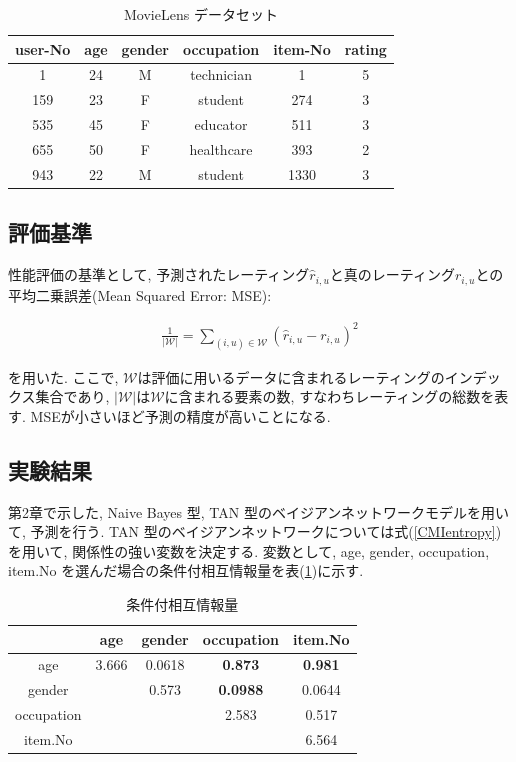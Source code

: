 \documentclass[a4j,12pt]{jarticle}
\begin{document}
\begin{table}[H]
\begin{center}
\caption{MovieLens データセット}   %
\begin{tabular}{|c|c|c|c|c|c|}
\hline
user-No	&	age	&	gender	&	occupation	&	item-No	& rating \\ \hline \hline
1	&	24	&	M	&	technician	&  1  & 5 \\	\hline
159	&    23	&     F	&      student	      &  274 & 3 \\	\hline
535	&	45	&	F	&	educator	&	511	& 3 \\ \hline
655	&	50	&	F	&	healthcare	& 393 & 2 \\	\hline
943	&	22	&	M	&	student	&	1330 & 3 \\  \hline
\end{tabular}
\end{center}
\end{table}
\subsection{評価基準}

性能評価の基準として, 予測されたレーティング$\hat{r}_{i, u}$と真のレーティング$r_{i, u}$との平均二乗誤差(Mean Squared Error: MSE):

\begin{eqnarray}
\label{MSE}
\frac{1}{|\mathcal W|} = \sum_{(i, u) \in \mathcal W} (\hat{r}_{i, u} - r_{i, u})^2
\end{eqnarray}

を用いた. ここで, $\mathcal W$は評価に用いるデータに含まれるレーティングのインデックス集合であり, $|\mathcal W|$は$\mathcal W$に含まれる要素の数, すなわちレーティングの総数を表す. MSEが小さいほど予測の精度が高いことになる.

\subsection{実験結果}

第2章で示した, Naive Bayes 型, TAN 型のベイジアンネットワークモデルを用いて, 予測を行う. TAN 型のベイジアンネットワークについては式(\ref{CMIentropy})を用いて, 関係性の強い変数を決定する. 変数として, age, gender, occupation, item.No を選んだ場合の条件付相互情報量を表(\ref{CMIsample})に示す.

\begin{table}[H]
\begin{center}
\label{CMIsample}
\caption{条件付相互情報量}
\begin{tabular}{|c||c|c|c|c|} \hline  
& age & gender & occupation & item.No \\ \hline \hline
age & 3.666 & 0.0618 & \bf{0.873} & \bf{0.981} \\
gender &  & 0.573 & \bf{0.0988} & 0.0644 \\
occupation &  &  & 2.583 & 0.517 \\
item.No &  &  &  & 6.564 \\ \hline
\end{tabular}
\end{center}
\end{table}
\end{document}
